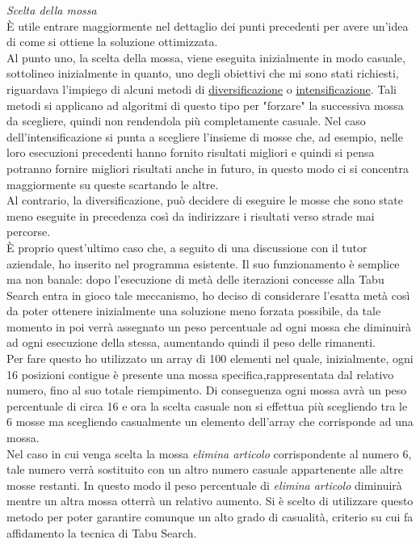 \textit{Scelta della mossa}\\
È utile entrare maggiormente nel dettaglio dei punti precedenti per avere un'idea di come si ottiene la soluzione ottimizzata.\\
Al punto uno, la scelta della mossa, viene eseguita inizialmente in modo casuale, sottolineo inizialmente in quanto, uno degli obiettivi che mi sono stati richiesti, riguardava
l'impiego di alcuni metodi di \hyperref[Diversificazione]{diversificazione\glo} o \hyperref[Intensificazione]{intensificazione\glo}. Tali metodi si applicano ad algoritmi di questo tipo per "forzare" la successiva mossa da scegliere,
quindi non rendendola più completamente casuale. Nel caso dell'intensificazione si punta a scegliere l'insieme di mosse che, ad esempio, nelle loro esecuzioni precedenti hanno fornito
risultati migliori e quindi si pensa potranno fornire migliori risultati anche in futuro, in questo modo ci si concentra maggiormente su queste scartando le altre.\\
Al contrario, la diversificazione, può decidere di eseguire le mosse che sono state meno eseguite in precedenza così da indirizzare i risultati verso strade mai 
percorse.\\ È proprio quest'ultimo caso che, a seguito di una discussione con il tutor aziendale, ho inserito nel programma esistente. Il suo funzionamento è semplice ma non banale:
dopo l'esecuzione di metà delle iterazioni concesse alla Tabu Search entra in gioco tale meccanismo, ho deciso di considerare l'esatta metà così da poter ottenere inizialmente una
soluzione meno forzata possibile, da tale momento in poi verrà assegnato un peso percentuale ad ogni mossa che diminuirà ad ogni esecuzione della stessa, aumentando quindi il 
peso delle rimanenti.\\ Per fare questo ho utilizzato un array di 100 elementi nel quale, inizialmente, ogni 16 posizioni contigue è presente una mossa specifica,rappresentata dal
relativo numero, fino al suo totale riempimento. Di conseguenza ogni mossa avrà un peso percentuale di circa 16 e ora la scelta casuale non si effettua più scegliendo tra le
6 mosse ma scegliendo casualmente un elemento dell'array che corrisponde ad una mossa.\\
Nel caso in cui venga scelta la mossa \textit{elimina articolo} corrispondente al numero 6, tale numero verrà sostituito con un altro numero casuale appartenente alle altre mosse
restanti. In questo modo il peso percentuale di \textit{elimina articolo} diminuirà mentre un altra mossa otterrà un relativo aumento. Si è scelto di utilizzare questo metodo
per poter garantire comunque un alto grado di casualità, criterio su cui fa affidamento la tecnica di Tabu Search.\\

